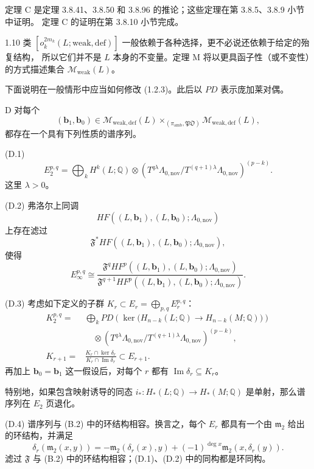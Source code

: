 定理 C 是定理 3.8.41、3.8.50 和 3.8.96 的推论；这些定理在第 3.8.5、3.8.9 小节中证明。
定理 C 的证明在第 3.8.10 小节完成。

\begin{remark}{1.10}\label{rem:1-10}
类 $[o_k^{2m_k}(L;\mathrm{weak,def})]$ 一般依赖于各种选择，更不必说还依赖于给定的殆复结构，
所以它们并不是 $L$ 本身的不变量。定理 M 将以更具函子性（或不变性）的方式描述集合
$\mathcal M_{\mathrm{weak}}(L)$。
\end{remark}

下面说明在一般情形中应当如何修改 (1.2.3)。此后以 $PD$ 表示庞加莱对偶。

\begin{theorem}{D}\label{thm:D}
对每个
\[
  (\mathbf b_1,\mathbf b_0)\in
  \mathcal M_{\mathrm{weak,def}}(L)
  \mathbin{\times_{(\pi_{\mathrm{amb}},\mathfrak{PO})}}
  \mathcal M_{\mathrm{weak,def}}(L),
\]
都存在一个具有下列性质的谱序列。

\textup{(D.1)}
\[
  E_2^{p,q}
  =\bigoplus_k H^k(L;\mathbb Q)\otimes
  \left(
    T^{q\lambda}\Lambda_{0,\mathrm{nov}}
    \big/ T^{(q+1)\lambda}\Lambda_{0,\mathrm{nov}}
  \right)^{(p-k)}.
\]
这里 $\lambda>0$。

\textup{(D.2)} 弗洛尔上同调
\[
  HF((L,\mathbf b_1),(L,\mathbf b_0);\Lambda_{0,\mathrm{nov}})
\]
上存在滤过
\[
  \mathfrak F^*HF((L,\mathbf b_1),(L,\mathbf b_0);\Lambda_{0,\mathrm{nov}}),
\]
使得
\[
  E_\infty^{p,q}\cong
  \frac{\mathfrak F^qHF^p((L,\mathbf b_1),(L,\mathbf b_0);\Lambda_{0,\mathrm{nov}})}
  {\mathfrak F^{q+1}HF^p((L,\mathbf b_1),(L,\mathbf b_0);\Lambda_{0,\mathrm{nov}})}.
\]

\textup{(D.3)} 考虑如下定义的子群
$K_r\subset E_r=\bigoplus_{p,q}E_r^{p,q}$：
\[
\begin{aligned}
  K_2^{p,q}
  ={}&\bigoplus_k
  PD\!\left(\ker\bigl(H_{n-k}(L;\mathbb Q)
  \longrightarrow H_{n-k}(M;\mathbb Q)\bigr)\right)\\
  &\quad\otimes
  \left(
    T^{q\lambda}\Lambda_{0,\mathrm{nov}}
    \big/T^{(q+1)\lambda}\Lambda_{0,\mathrm{nov}}
  \right)^{(p-k)},\\
  K_{r+1}
  ={}&\frac{K_r\cap\ker\delta_r}{K_r\cap\operatorname{Im}\delta_r}
  \subset E_{r+1}.
\end{aligned}
\]
再加上 $\mathbf b_0=\mathbf b_1$ 这一假设后，对每个 $r$ 都有
$\operatorname{Im}\delta_r\subseteq K_r$。

特别地，如果包含映射诱导的同态
$i_*\colon H_*(L;\mathbb Q)\to H_*(M;\mathbb Q)$ 是单射，那么谱序列在 $E_2$ 页退化。

\textup{(D.4)} 谱序列与 (B.2) 中的环结构相容。换言之，每个 $E_r$ 都具有一个由
$\mathfrak m_2$ 给出的环结构，并满足
\[
  \delta_r(\mathfrak m_2(x,y))
  =-\mathfrak m_2(\delta_r(x),y)
  +(-1)^{\deg x}\mathfrak m_2(x,\delta_r(y)).
\]
滤过 $\mathfrak F$ 与 (B.2) 中的环结构相容；(D.1)、(D.2) 中的同构都是环同构。
\end{theorem}

